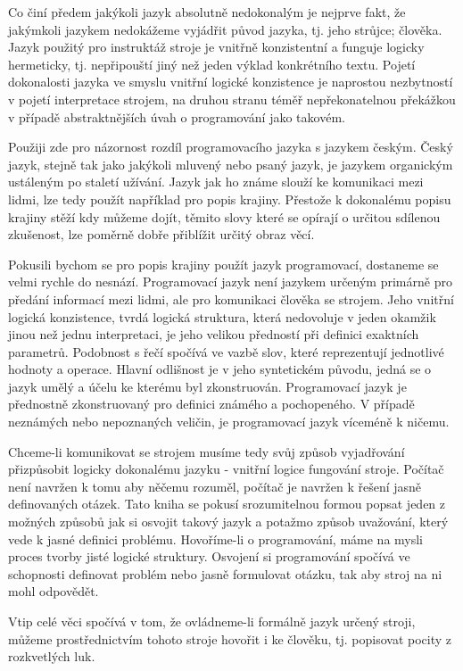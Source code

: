 \documentclass[11pt]{book}
\begin{document}
Co činí předem jakýkoli jazyk absolutně nedokonalým je nejprve fakt, že jakýmkoli jazykem nedokážeme vyjádřit původ jazyka, tj. jeho strůjce; člověka. Jazyk použitý pro instruktáž stroje je vnitřně konzistentní a funguje logicky hermeticky, tj. nepřipouští jiný než jeden výklad konkrétního textu. Pojetí dokonalosti jazyka ve smyslu vnitřní logické konzistence je naprostou nezbytností v pojetí interpretace strojem, na druhou stranu téměř nepřekonatelnou překážkou v případě abstraktnějších úvah o programování jako takovém.

Použiji zde pro názornost rozdíl programovacího jazyka s jazykem českým. Český jazyk, stejně tak jako jakýkoli mluvený nebo psaný jazyk, je jazykem organickým ustáleným po staletí užívání. Jazyk jak ho známe slouží ke komunikaci mezi lidmi, lze tedy použít například pro popis krajiny. Přestože k dokonalému popisu krajiny stěží kdy můžeme dojít, těmito slovy které se opírají o určitou sdílenou zkušenost, lze poměrně dobře přiblížit určitý obraz věcí.

Pokusili bychom se pro popis krajiny použít jazyk programovací, dostaneme se velmi rychle do nesnází. Programovací jazyk není jazykem určeným primárně pro předání informací mezi lidmi, ale pro komunikaci člověka se strojem. Jeho vnitřní logická konzistence, tvrdá logická struktura, která nedovoluje v jeden okamžik jinou než jednu interpretaci, je jeho velikou předností při definici exaktních parametrů. Podobnost s řečí spočívá ve vazbě slov, které reprezentují jednotlivé hodnoty a operace. Hlavní odlišnost je v jeho syntetickém původu, jedná se o jazyk umělý a účelu ke kterému byl zkonstruován. Programovací jazyk je přednostně zkonstruovaný pro definici známého a pochopeného. V případě neznámých nebo nepoznaných veličin, je programovací jazyk víceméně k ničemu. 

Chceme-li komunikovat se strojem musíme tedy svůj způsob vyjadřování přizpůsobit logicky dokonalému jazyku - vnitřní logice fungování stroje. Počítač není navržen k tomu aby něčemu rozuměl, počítač je navržen k řešení jasně definovaných otázek. Tato kniha se pokusí srozumitelnou formou popsat jeden z možných způsobů jak si osvojit takový jazyk a potažmo způsob uvažování, který vede k jasné definici problému. Hovoříme-li o programování, máme na mysli proces tvorby jisté logické struktury. Osvojení si programování spočívá ve schopnosti definovat problém nebo jasně formulovat otázku, tak aby stroj na ni mohl odpovědět.

Vtip celé věci spočívá v tom, že ovládneme-li formálně jazyk určený stroji, můžeme prostřednictvím tohoto stroje hovořit i ke člověku, tj. popisovat pocity z rozkvetlých luk.
\end{document}
